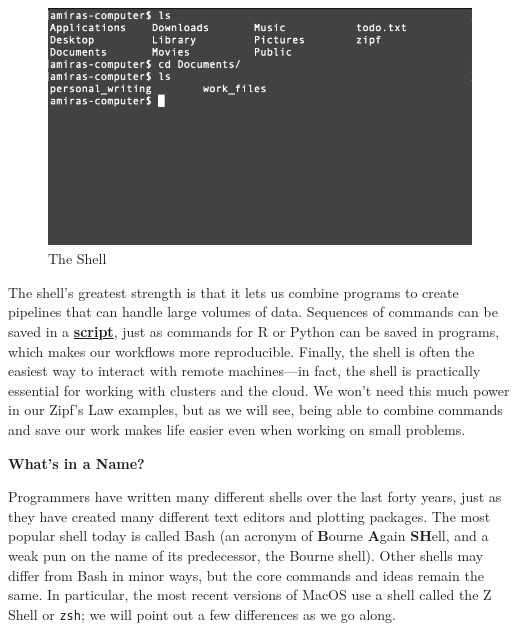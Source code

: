 \documentclass[
]{krantz}
\renewenvironment{quote}{\begin{VF}}{\end{VF}}
\newcommand{\gref}[2]{\hyperlink{#2}{\textbf{#1}}}
\begin{document}
\begin{figure}

{\centering \includegraphics[width=1\linewidth]{figures/bash-basics/the-shell} 

}

\caption{The Shell}\label{fig:bash-basics-repl}
\end{figure}

The shell's greatest strength is that
it lets us combine programs to create pipelines
that can handle large volumes of data.
Sequences of commands can be saved in a \gref{script}{script},
just as commands for R or Python can be saved in programs,
which makes our workflows more reproducible.
Finally,
the shell is often the easiest way to interact with remote machines---in fact,
the shell is practically essential for working with clusters and the cloud.
We won't need this much power in our Zipf's Law examples,
but as we will see,
being able to combine commands and save our work
makes life easier even when working on small problems.

\begin{quote}
\textbf{What's in a Name?}

Programmers have written many different shells over the last forty years,
just as they have created many different text editors and plotting packages.
The most popular shell today is called Bash
(an acronym of \textbf{B}ourne \textbf{A}gain \textbf{SH}ell,
and a weak pun on the name of its predecessor,
the Bourne shell).
Other shells may differ from Bash in minor ways,
but the core commands and ideas remain the same.
In particular,
the most recent versions of MacOS use a shell called the Z Shell or \texttt{zsh};
we will point out a few differences as we go along.
\end{quote}
\end{document}
